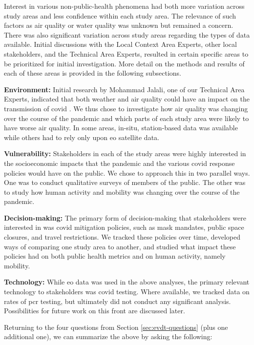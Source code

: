 Interest in various non-public-health phenomena had both more variation across study areas and less confidence within each study area. The relevance of such factors as air quality or water quality was unknown but remained a concern. There was also significant variation across study areas regarding the types of data available. Initial discussions with the Local Context Area Experts, other local stakeholders, and the Technical Area Experts, resulted in certain specific areas to be prioritized for initial investigation. More detail on the methods and results of each of these areas is provided in the following subsections.

\textbf{Environment:} Initial research by Mohammad Jalali, one of our Technical Area Experts, indicated that both weather and air quality could have an impact on the transmission of \ac{covid} \cite{xuModestImpactWeather2020}. We thus chose to investigate how air quality was changing over the course of the pandemic and which parts of each study area were likely to have worse air quality. In some areas, in-situ, station-based data was available while others had to rely only upon \ac{eo} satellite data.

\textbf{Vulnerability:} Stakeholders in each of the study areas were highly interested in the socioeconomic impacts that the pandemic and the various \ac{covid} response policies would have on the public. We chose to approach this in two parallel ways. One was to conduct qualitative surveys of members of the public. The other was to study how human activity and mobility was changing over the course of the pandemic.

\textbf{Decision-making:} The primary form of decision-making that stakeholders were interested in was \ac{covid} mitigation policies, such as mask mandates, public space closures, and travel restrictions. We tracked these policies over time, developed ways of comparing one study area to another, and studied what impact these policies had on both public health metrics and on human activity, namely mobility.

\textbf{Technology:} While \ac{eo} data was used in the above analyses, the primary relevant technology to stakeholders was \ac{covid} testing. Where available, we tracked data on rates of \ac{pcr} testing, but ultimately did not conduct any significant analysis. Possibilities for future work on this front are discussed later.

Returning to the four questions from Section \ref{sec:evdt-questions} (plus one additional one), we can summarize the above by asking the following:

